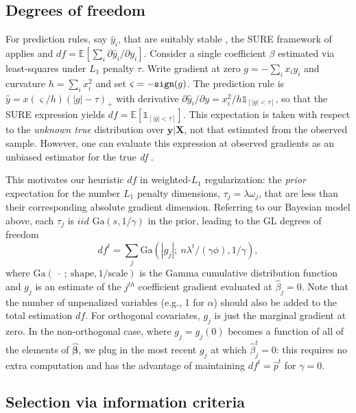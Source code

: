 \documentclass[12pt]{article}
\newcommand{\bs}[1]{\boldsymbol{#1}}
\newcommand{\mr}[1]{\mathrm{#1}}
\newcommand{\bm}[1]{\mathbf{#1}}
\newcommand{\ds}[1]{\mathds{#1}}
\begin{document}
\subsection{Degrees of freedom}


For prediction rules, say $\hat y_i$, that are suitably stable \citep[i.e.,
Lipschitz; see][]{zou_degrees_2007}, the SURE framework of
\cite{stein_estimation_1981} applies and  $df =
\ds{E}\left[\sum_i \partial \hat y_i/\partial y_i\right]$.
Consider  a single coefficient $\beta$ estimated via least-squares under $L_1$
penalty $\tau$.   Write gradient at zero $g = -\sum_i x_iy_i$ and curvature $h
= \sum_i x_i^2$ and set $\varsigma = -{\tt sign}(g)$. The prediction rule is
$\hat y = x(\varsigma/h)(|g|-\tau)_+$ with  derivative $\partial\hat y_i/\partial y = x_i^2/h \ds{1}_{[|g|<\tau]}$, so that the SURE expression
yields $df = \ds{E}\left[ \ds{1}_{[|g|<\tau]} \right]$.   This expectation is
taken with respect to the {\it unknown true} distribution over $\bm{y} |
\bm{X}$, not that estimated from the observed sample.  However, 
 one can evaluate this expression at observed
gradients as an unbiased estimator for the true \textit{df} \citep[e.g.,][]{zou_degrees_2007}.

This motivates our heuristic $df$ in weighted-$L_1$ regularization:  the {\it prior} expectation for the number  $L_1$ penalty dimensions, $\tau_j = \lambda \omega_j$, that are less than their corresponding absolute gradient dimension.  Referring to our Bayesian model above, each $\tau_j$ is $iid$ $\mr{Ga}(s,1/\gamma)$ in the prior,
leading to the GL degrees of freedom
\begin{equation}
\label{edf} df^t = \sum_j \mr{Ga}(|g_{j}|;~n\lambda^t/(\gamma\phi),
1/\gamma), \end{equation} where $\mr{Ga}(~\cdot~;~\mr{shape}, 1/\mr{scale})$
is the Gamma cumulative distribution function and $g_j$ is an estimate of  the
$j^{th}$ coefficient gradient evaluated at $\hat\beta_j=0$. Note that
the number of unpenalized variables (e.g., 1 for $\alpha$) should also be
added to the total  estimation $df$.  For  orthogonal covariates,  $g_j$ is
just the marginal gradient at zero. In the non-orthogonal case, where $g_{j} =
g_j(0)$ becomes a function of all of the elements of $\bs{\hat\beta}$, we plug
in the most recent $g_j$ at which $\hat\beta^t_j=0$:  this requires no extra
computation and has the advantage of maintaining $df^t =
\hat p^t$ for $\gamma = 0$.

\subsection{Selection via information criteria}
\end{document}
